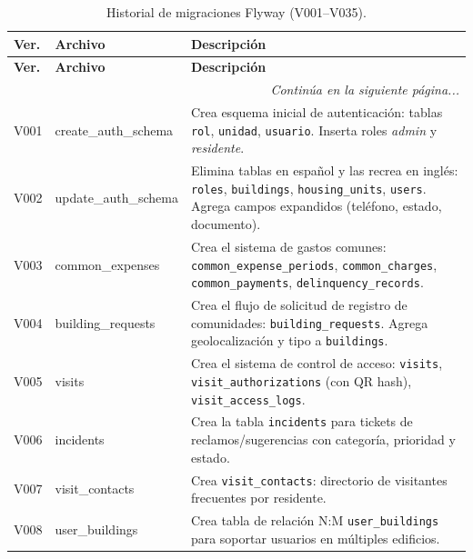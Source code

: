 \begin{longtable}{|p{}|p{}|p{}|}
\caption{Historial de migraciones Flyway (V001--V035).} \label{tab:migraciones} \\
\hline
\textbf{Ver.} & \textbf{Archivo} & \textbf{Descripción} \\ \hline
\endfirsthead
\hline \textbf{Ver.} & \textbf{Archivo} & \textbf{Descripción} \\ \hline
\endhead
\hline \multicolumn{3}{|r|}{\small\textit{Continúa en la siguiente página...}} \\ \hline
\endfoot
\hline
\endlastfoot

V001 & create\_auth\_schema & Crea esquema inicial de autenticación: tablas \texttt{rol}, \texttt{unidad}, \texttt{usuario}. Inserta roles \textit{admin} y \textit{residente}. \\ \hline

V002 & update\_auth\_schema & Elimina tablas en español y las recrea en inglés: \texttt{roles}, \texttt{buildings}, \texttt{housing\_units}, \texttt{users}. Agrega campos expandidos (teléfono, estado, documento). \\ \hline

V003 & common\_expenses & Crea el sistema de gastos comunes: \texttt{common\_expense\_periods}, \texttt{common\_charges}, \texttt{common\_payments}, \texttt{delinquency\_records}. \\ \hline

V004 & building\_requests & Crea el flujo de solicitud de registro de comunidades: \texttt{building\_requests}. Agrega geolocalización y tipo a \texttt{buildings}. \\ \hline

V005 & visits & Crea el sistema de control de acceso: \texttt{visits}, \texttt{visit\_authorizations} (con QR hash), \texttt{visit\_access\_logs}. \\ \hline

V006 & incidents & Crea la tabla \texttt{incidents} para tickets de reclamos/sugerencias con categoría, prioridad y estado. \\ \hline

V007 & visit\_contacts & Crea \texttt{visit\_contacts}: directorio de visitantes frecuentes por residente. \\ \hline

V008 & user\_buildings & Crea tabla de relación N:M \texttt{user\_buildings} para soportar usuarios en múltiples edificios. \\ \hline


\end{longtable}
